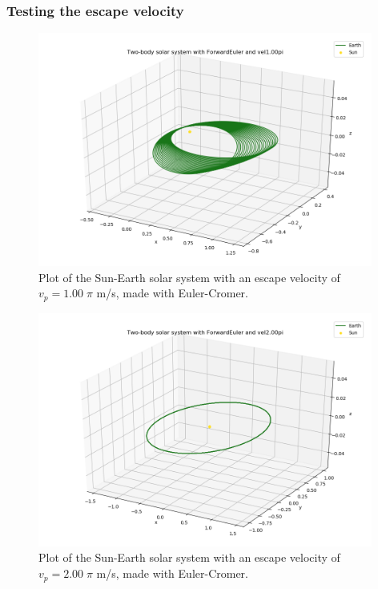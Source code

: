 \documentclass{article}
\begin{document}
\subsubsection{Testing the escape velocity}

    \begin{figure}[H]
        \centering
        \includegraphics[width = 11cm]{img/plot3D_S_E_F_vel100pi.png}
        \caption{Plot of the Sun-Earth solar system with an escape velocity of $v_p = 1.00 \; \pi$ m/s, made with Euler-Cromer. }
        \label{fig:plot3D_S_E_F_vel100pi}
    \end{figure}

    \begin{figure}[H]
        \centering
        \includegraphics[width = 11cm]{img/plot3D_S_E_F_vel200pi.png}
        \caption{Plot of the Sun-Earth solar system with an escape velocity of $v_p = 2.00 \; \pi$ m/s, made with Euler-Cromer. }
        \label{fig:plot3D_S_E_F_vel200pi}
    \end{figure}
\end{document}
